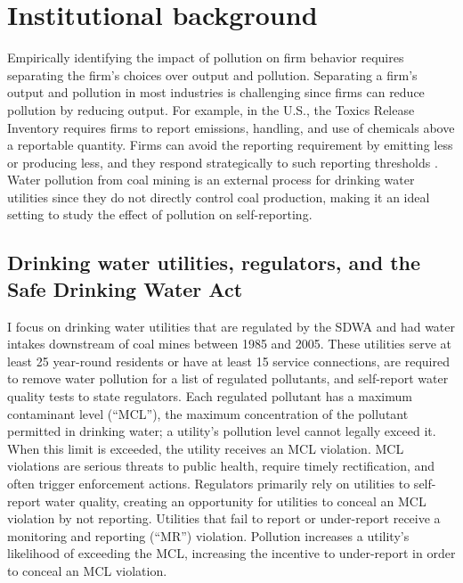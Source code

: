 \documentclass[12pt]{article}
\begin{document}
\section{Institutional background}\label{sec:background}

Empirically identifying the impact of pollution on firm behavior requires separating the firm's choices over output and pollution. Separating a firm's output and pollution in most industries is challenging since firms can reduce pollution by reducing output. For example, in the U.S., the Toxics Release Inventory requires firms to report emissions, handling, and use of chemicals above a reportable quantity. Firms can avoid the reporting requirement by emitting less or producing less, and they respond strategically to such reporting thresholds \parencite{bennear2005strategic}. Water pollution from coal mining is an external process for drinking water utilities since they do not directly control coal production, making it an ideal setting to study the effect of pollution on self-reporting.

\subsection{Drinking water utilities, regulators, and the Safe Drinking Water Act}

I focus on drinking water utilities that are regulated by the SDWA and had water intakes downstream of coal mines between 1985 and 2005. These utilities serve at least 25 year-round residents or have at least 15 service connections, are required to remove water pollution for a list of regulated pollutants, and self-report water quality tests to state regulators. Each regulated pollutant has a maximum contaminant level (``MCL''), the maximum concentration of the pollutant permitted in drinking water; a utility's pollution level cannot legally exceed it. When this limit is exceeded, the utility receives an MCL violation. MCL violations are serious threats to public health, require timely rectification, and often trigger enforcement actions. Regulators primarily rely on utilities to self-report water quality, creating an opportunity for utilities to conceal an MCL violation by not reporting. Utilities that fail to report or under-report receive a monitoring and reporting (``MR'') violation. Pollution increases a utility's likelihood of exceeding the MCL, increasing the incentive to under-report in order to conceal an MCL violation.
\end{document}
